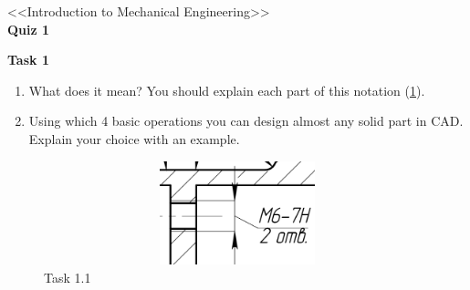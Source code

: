 \documentclass[12pt]{article}
\newcommand\pic[1]{(\cref{#1})} %
\begin{document}
\begin{center}
    \LARGE <<Introduction to Mechanical Engineering>> \\ \textbf{Quiz 1}
\end{center}

\textbf{Task 1}
\begin{enumerate}
    \item What does it mean? You should explain each part of this notation \pic{fig:resources_quiz_1/quiz1_task1.png}.
    \item Using which 4 basic operations you can design almost any solid part in CAD. Explain your choice with an example.
\end{enumerate}
\begin{figure}[H]
    \centering\includegraphics[height=3cm,width=1\textwidth,keepaspectratio]{resources_quiz_1/quiz1_task1.png}
    \caption{Task 1.1}
    \label{fig:resources_quiz_1/quiz1_task1.png}
\end{figure}
\end{document}
